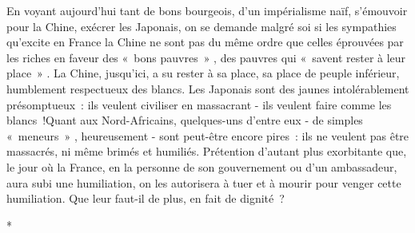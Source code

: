 \documentclass[french,twoside]{book} %
\begin{document}
En voyant aujourd'hui tant de bons bourgeois, d'un impérialisme naïf, s'émouvoir pour la Chine, exécrer les Japonais, on se demande malgré soi si les sympathies qu'excite en France la Chine ne sont pas du même ordre que celles éprouvées par les riches en faveur des « bons pauvres » , des pauvres qui « savent rester à leur place » . La Chine, jusqu'ici, a su rester à sa place, sa place de peuple inférieur, humblement respectueux des blancs. Les Japonais sont des jaunes intolérablement présomptueux : ils veulent civiliser en massacrant - ils veulent faire comme les blancs !Quant aux Nord-Africains, quelques-uns d'entre eux - de simples « meneurs » , heureusement - sont peut-être encore pires : ils ne veulent pas être massacrés, ni même brimés et humiliés. Prétention d'autant plus exorbitante que, le jour où la France, en la personne de son gouvernement ou d'un ambassadeur, aura subi une humilia­tion, on les autorisera à tuer et à mourir pour venger cette humiliation. Que leur faut-il de plus, en fait de dignité ?\par
\par

\begin{center}
\noindent \centerline{*}\par
\end{center}
\end{document}
